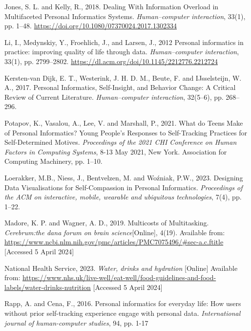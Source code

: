 \documentclass[11pt]{article}
\begin{document}
\renewcommand{\refname}{} 
\vspace{-20pt}
\begin{thebibliography}{99}
    Jones, S. L. and Kelly, R., 2018. 
    Dealing With Information Overload in Multifaceted Personal Informatics Systems. 
    \textit{Human–computer interaction}, 33(1), pp. 1–48. \url{https://doi.org/10.1080/07370024.2017.1302334}

    Li, I., Medynskiy, Y., Froehlich, J., and Larsen, J., 2012 
    Personal informatics in practice: 
	 improving quality of life through data.
    \textit{Human–computer interaction}, 33(1),  pp. 2799–2802. \url{https://dl.acm.org/doi/10.1145/2212776.2212724}

    Kersten-van Dijk, E. T., Westerink, J. H. D. M., Beute, F. and 
    IJsselsteijn, W. A., 2017. 
    Personal Informatics, Self-Insight, and Behavior Change: A Critical Review of Current Literature. 
    \textit{Human–computer interaction}, 32(5–6), pp. 268–296.

    Potapov, K., Vasalou, A., Lee, V. and Marshall, P., 2021. 
    What do Teens Make of Personal Informatics? 
    Young People's Responses to Self-Tracking Practices for Self-Determined Motives. 
    \textit{Proceedings of the 2021 CHI Conference on Human Factors in Computing Systems}, 
    8-13 May 2021, New York. Association for Computing Machinery, pp. 1–10.

    Loerakker, M.B., Niess, J., Bentvelzen, M. and Woźniak, P.W., 2023. 
    Designing Data Visualisations for Self-Compassion in Personal Informatics. 
    \textit{Proceedings of the ACM on interactive, mobile, wearable and ubiquitous technologies}, 7(4), pp. 1–22.

    Madore, K. P. and Wagner, A. D., 2019. Multicosts of Multitasking. 
    \textit{Cerebrum:the dana forum on brain science}[Online], 4(19). Available from:
    \url{https://www.ncbi.nlm.nih.gov/pmc/articles/PMC7075496/#sec-a.c.ftitle} 
    [Accessed 5 April 2024]

    National Health Service, 2023. \textit{Water, drinks and hydration} [Online] 
    Available from: 
    \url{https://www.nhs.uk/live-well/eat-well/food-guidelines-and-food-labels/water-drinks-nutrition} 
    [Accessed 5 April 2024]
    
    Rapp, A. and Cena, F., 2016. Personal informatics for everyday life: 
    How users without prior self-tracking experience engage with personal data. 
    \textit{International journal of human-computer studies}, 94, pp. 1-17


\end{thebibliography}
\end{document}
